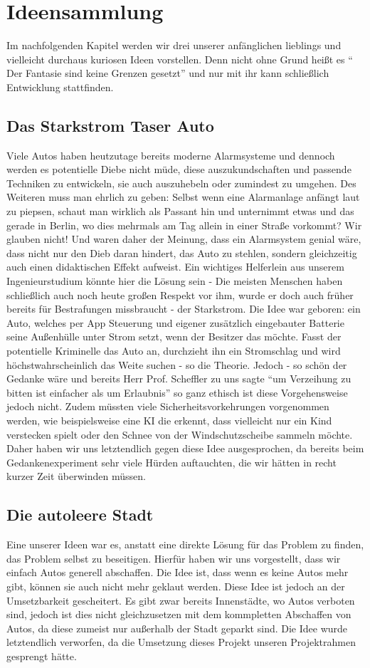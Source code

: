 \section{Ideensammlung}
Im nachfolgenden Kapitel werden wir drei unserer anfänglichen lieblings und vielleicht durchaus kuriosen Ideen vorstellen. Denn  nicht ohne Grund heißt es “ Der Fantasie sind keine Grenzen gesetzt” und nur mit ihr kann schließlich Entwicklung stattfinden.

\subsection{Das Starkstrom Taser Auto}
Viele Autos haben heutzutage bereits moderne Alarmsysteme und dennoch werden es potentielle Diebe nicht müde, diese auszukundschaften und passende Techniken zu entwickeln, sie auch auszuhebeln oder zumindest zu umgehen. Des Weiteren muss man ehrlich zu geben: Selbst wenn eine Alarmanlage anfängt laut zu piepsen, schaut man wirklich als Passant hin und unternimmt etwas und das gerade in Berlin, wo dies mehrmals am Tag allein in einer Straße vorkommt? Wir glauben nicht! Und waren daher der Meinung, dass ein Alarmsystem genial wäre, dass  nicht nur den Dieb daran hindert, das Auto zu stehlen, sondern gleichzeitig auch einen didaktischen Effekt aufweist. Ein wichtiges Helferlein aus unserem Ingenieurstudium könnte hier die Lösung sein - Die meisten Menschen haben schließlich auch noch heute großen Respekt vor ihm, wurde er doch auch früher bereits für Bestrafungen missbraucht - der Starkstrom. Die Idee war geboren: ein Auto, welches per App Steuerung und eigener zusätzlich eingebauter Batterie seine Außenhülle unter Strom setzt, wenn der Besitzer das möchte. Fasst der potentielle Kriminelle das Auto an, durchzieht ihn ein Stromschlag und wird höchstwahrscheinlich das Weite suchen - so die Theorie. Jedoch - so schön der Gedanke wäre und bereits Herr Prof. Scheffler zu uns sagte “um Verzeihung zu bitten ist einfacher als um Erlaubnis” so ganz ethisch ist diese Vorgehensweise jedoch nicht. Zudem müssten viele Sicherheitsvorkehrungen vorgenommen werden, wie beispielsweise eine KI die erkennt, dass vielleicht nur ein Kind verstecken spielt oder den Schnee von der Windschutzscheibe sammeln möchte. Daher haben wir uns letztendlich gegen diese Idee ausgesprochen, da bereits beim Gedankenexperiment sehr viele Hürden auftauchten, die wir hätten in recht kurzer Zeit überwinden müssen.

\subsection{Die autoleere Stadt}
Eine unserer Ideen war es, anstatt eine direkte Lösung für das Problem zu finden, das Problem selbst zu beseitigen. Hierfür haben wir uns vorgestellt, dass wir einfach Autos generell abschaffen. Die Idee ist, dass wenn es keine Autos mehr gibt, können sie auch nicht mehr geklaut werden. Diese Idee ist jedoch an der Umsetzbarkeit gescheitert. Es gibt zwar bereits Innenstädte, wo Autos verboten sind, jedoch ist dies nicht gleichzusetzen mit dem kommpletten Abschaffen von Autos, da diese zumeist nur außerhalb der Stadt geparkt sind. Die Idee wurde letztendlich verworfen, da die Umsetzung dieses Projekt unseren Projektrahmen gesprengt hätte. 
